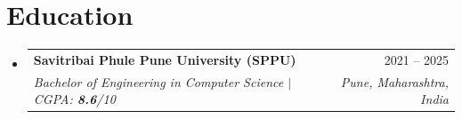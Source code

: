 \documentclass[a4paper,11pt]{article}
\makeatletter
\newcommand{\resumeQuadHeading}[4]{
  \item
  \begin{tabular*}{0.97\textwidth}[t]{l@{\extracolsep{\fill}}r}
    \textbf{#1} & #2 \\
    \textit{\small#3} & \textit{\small #4} \\
  \end{tabular*}
}
\newcommand{\resumeHeadingListStart}{
  \begin{itemize}[leftmargin=0.1in, label={}]
}
\newcommand{\resumeHeadingListEnd}{\end{itemize}}
\makeatother
\begin{document}
\section{Education}
  \resumeHeadingListStart{}
    \resumeQuadHeading{Savitribai Phule Pune University (SPPU)}{2021 -- 2025}
    {Bachelor of Engineering in Computer Science $|$ CGPA: \textbf{8.6}/10}{Pune, Maharashtra, India}
  \resumeHeadingListEnd{}
\end{document}
